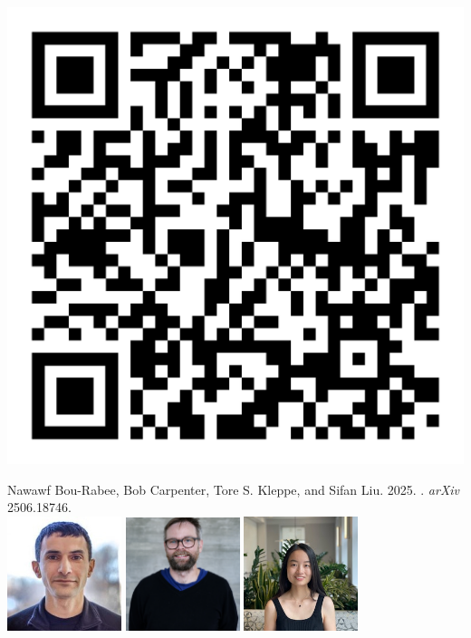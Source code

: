 \documentclass[10pt]{report}
\begin{document}
\spc
\noindent
\begin{minipage}[t]{0.35\textwidth}
\includegraphics[width=\textwidth]{img/qr-code.pdf}
\end{minipage}
\quad
\begin{minipage}[t]{0.6\textwidth}
  \vspace*{-1.55in}
  {\small Nawawf Bou-Rabee, Bob Carpenter, Tore S. Kleppe, and Sifan Liu.
      2025. . \textit{arXiv} 2506.18746.}
      \\[12pt]
      \includegraphics[width=0.25\textwidth]{img/nawaf.jpg}
      \hfill
      \includegraphics[width=0.25\textwidth]{img/tore.png}
      \hfill
      \includegraphics[width=0.25\textwidth]{img/sifan.jpg}
\end{minipage}
\hfill
\null
\end{document}
